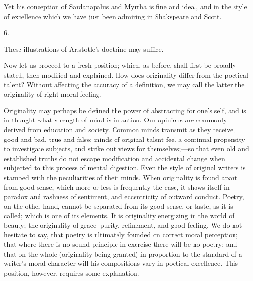 Yet his conception of Sardanapalus and Myrrha is fine and ideal,
and in the style of excellence which we have just been admiring in
Shakspeare and Scott.

6.

These illustrations of Aristotle's doctrine may suffice.

Now let us
proceed to a fresh position; which, as before, shall first be broadly
stated, then modified and explained. How does originality differ from
the poetical talent? Without affecting the accuracy of a definition,
we may call the latter the originality of right moral feeling.

Originality may perhaps be defined the power of abstracting for one's
self, and is in thought what strength of mind is in action. Our
opinions are commonly derived from education and society. Common minds
transmit as they receive, good and bad, true and false; minds of
original talent feel a continual propensity to investigate subjects,
and strike out views for themselves;—so that even old and
established truths do not escape modification and accidental change
when subjected to this process of mental digestion. Even the style of
original writers is stamped with the peculiarities of their
minds. When originality is found apart from good sense, which more or
less is frequently the case, it shows itself in paradox and rashness
of sentiment, and eccentricity of outward conduct. Poetry, on the
other hand, cannot be separated from its good sense, or taste, as it
is called; which is one of its elements. It is originality energizing
in the world of beauty; the originality of grace, purity, refinement,
and good feeling. We do not hesitate to say, that poetry is ultimately
founded on correct moral perception; that where there is no sound
principle in exercise there will be no poetry; and that on the whole
(originality being granted) in proportion to the standard of a writer's
moral character will his compositions vary in poetical excellence.
This position, however, requires some explanation.

